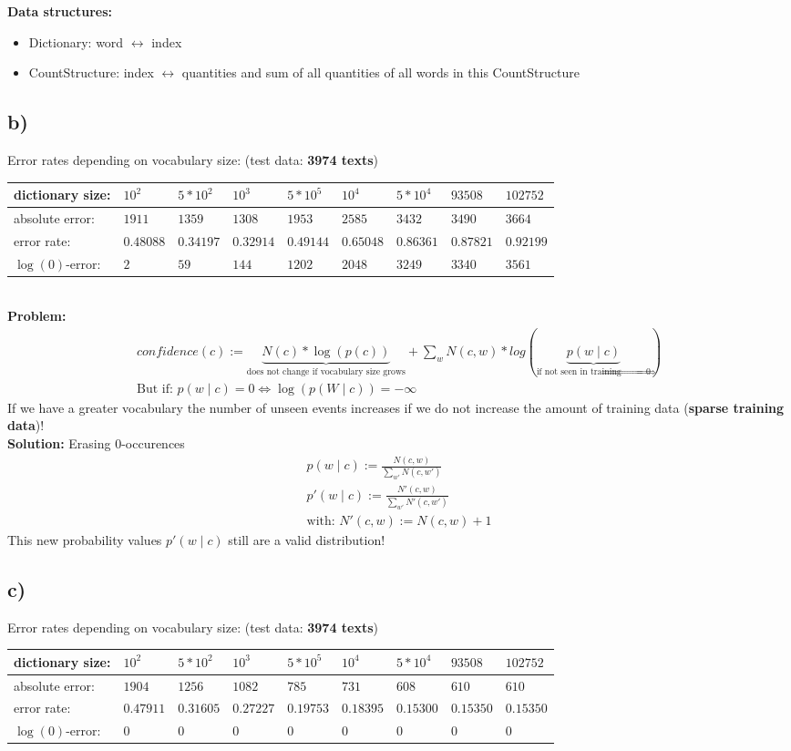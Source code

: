 \documentclass[12pt, a4paper, fleqn]{scrartcl}
\begin{document}
\newpage
\textbf{Data structures:}
\begin{itemize}
\item Dictionary: word $\leftrightarrow$ index
\item CountStructure: index $\leftrightarrow$ quantities and sum of all quantities of all words in this CountStructure
\end{itemize}
\subsection*{b)}
Error rates depending on vocabulary size: (test data: \textbf{3974 texts})\\
\begin{tabular}{l|l|l|l|l|l|l|l|l}
dictionary size: & $10^2$ & $5*10^2$ & $10^3$ & $5*10^5$ & $10^4$ & $5*10^4$ & $93508$ & $102752$\\
\hline
absolute error: & $1911$ & $1359$ & $1308$ & $1953$ & $2585$ & $3432$ & $3490$ & $3664$\\
error rate: & $0.48088$ & $0.34197$ & $0.32914$ & $0.49144$ & $0.65048$ & $0.86361$ & $0.87821$ & $0.92199$\\
$\log(0)$-error: & $2$ & $59$ & $144$ & $1202$ & $2048$ & $3249$ & $3340$ & $3561$
\end{tabular}\\
\textbf{Problem:} 
\begin{align*}
confidence(c) := \underbrace{N(c) * \log(p(c))}_{\text{does not change if vocabulary size grows}} + \sum\limits_{w} N(c,w) * log(\underbrace{p(w\mid c)}_{\text{if not seen in training $\Rightarrow$ = 0}})\\
\text{But if: } p(w\mid c) = 0 \Leftrightarrow \log(p(W\mid c)) = -\infty
\end{align*}
If we have a greater vocabulary the number of unseen events increases if we do not increase the amount of training data (\textbf{sparse training data})!\\
\textbf{Solution:} Erasing 0-occurences
\begin{align*}
p(w\mid c) := \frac{N(c,w)}{\sum\limits_{w'} N(c,w')}\\
p'(w\mid c) := \frac{N'(c,w)}{\sum\limits_{w'} N'(c,w')}\\
\text{with: } N'(c,w) := N(c,w) + 1
\end{align*}
This new probability values $p'(w\mid c)$ still are a valid distribution!
\subsection*{c)}
Error rates depending on vocabulary size: (test data: \textbf{3974 texts})\\
\begin{tabular}{l|l|l|l|l|l|l|l|l}
dictionary size: & $10^2$ & $5*10^2$ & $10^3$ & $5*10^5$ & $10^4$ & $5*10^4$ & $93508$ & $102752$\\
\hline
absolute error: & $1904$ & $1256$ & $1082$ & $785$ & $731$ & $608$ & $610$ & $610$\\
error rate: & $0.47911$ & $0.31605$ & $0.27227$ & $0.19753$ & $0.18395$ & $0.15300$ & $0.15350$ & $0.15350$\\
$\log(0)$-error: & $0$ & $0$ & $0$ & $0$ & $0$ & $0$ & $0$ & $0$
\end{tabular}
\end{document}
